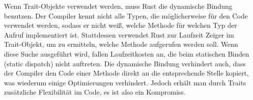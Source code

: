 Wenn Trait-Objekte verwendet werden, muss Rust die dynamische Bindung benutzen. Der Compiler kennt nicht alle Typen, die möglicherweise für den Code verwendet werden, sodass er nicht weiß, welche Methode für welchen Typ der Aufruf implementiert ist. Stattdessen verwendet Rust zur Laufzeit Zeiger im Trait-Objekt, um zu ermitteln, welche Methode aufgerufen werden soll. Wenn diese Suche ausgeführt wird, fallen Laufzeitkosten an, die beim statischen Binden (static dispatch) nicht auftreten. Die dynamische Bindung verhindert auch, dass der Compiler den Code einer Methode direkt an die entsprechende Stelle kopiert, was wiederum einige Optimierungen verhindert. Jedoch erhält man durch Traits zusätzliche Flexibilität im Code, es ist also ein Kompromiss.



